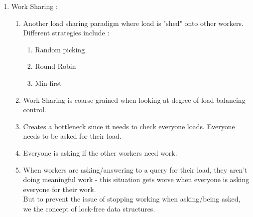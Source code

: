 \documentclass[twoside]{article}
\begin{document}
\begin{enumerate}
\item Work Sharing : 
\begin{enumerate}
\item Another load sharing paradigm where load is "shed" onto other workers. Different strategies include : 
\begin{enumerate}
\item Random picking
\item Round Robin
\item Min-first
\end{enumerate}
\item Work Sharing is coarse grained when looking at degree of load balancing control. 
\item Creates a bottleneck since it needs to check everyone loads. Everyone needs to be asked for their load. 
\item Everyone is asking if the other workers need work.
\item When workers are asking/answering to a query for their load, they aren't doing meaningful work - this situation gets worse when everyone is asking everyone for their work. \\
But to prevent the issue of stopping working when asking/being asked, we the concept of lock-free data structures.
\end{enumerate}

\end{enumerate}
\end{document}
